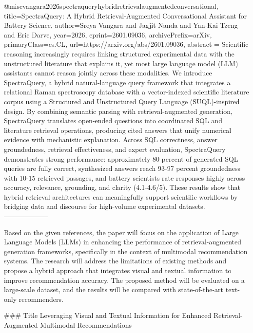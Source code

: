 {}@misc{vangara2026spectraqueryhybridretrievalaugmentedconversational,
      title={SpectraQuery: A Hybrid Retrieval-Augmented Conversational Assistant for Battery Science}, 
      author={Sreya Vangara and Jagjit Nanda and Yan-Kai Tzeng and Eric Darve},
      year={2026},
      eprint={2601.09036},
      archivePrefix={arXiv},
      primaryClass={cs.CL},
      url={https://arxiv.org/abs/2601.09036},
      abstract = {Scientific reasoning increasingly requires linking structured experimental data with the unstructured literature that explains it, yet most large language model (LLM) assistants cannot reason jointly across these modalities. We introduce SpectraQuery, a hybrid natural-language query framework that integrates a relational Raman spectroscopy database with a vector-indexed scientific literature corpus using a Structured and Unstructured Query Language (SUQL)-inspired design. By combining semantic parsing with retrieval-augmented generation, SpectraQuery translates open-ended questions into coordinated SQL and literature retrieval operations, producing cited answers that unify numerical evidence with mechanistic explanation. Across SQL correctness, answer groundedness, retrieval effectiveness, and expert evaluation, SpectraQuery demonstrates strong performance: approximately 80 percent of generated SQL queries are fully correct, synthesized answers reach 93-97 percent groundedness with 10-15 retrieved passages, and battery scientists rate responses highly across accuracy, relevance, grounding, and clarity (4.1-4.6/5). These results show that hybrid retrieval architectures can meaningfully support scientific workflows by bridging data and discourse for high-volume experimental datasets.}
}
        --------------------
        


Based on the given references, the paper will focus on the application of Large Language Models (LLMs) in enhancing the performance of retrieval-augmented generation frameworks, specifically in the context of multimodal recommendation systems. The research will address the limitations of existing methods and propose a hybrid approach that integrates visual and textual information to improve recommendation accuracy. The proposed method will be evaluated on a large-scale dataset, and the results will be compared with state-of-the-art text-only recommenders.

### Title
Leveraging Visual and Textual Information for Enhanced Retrieval-Augmented Multimodal Recommendations


